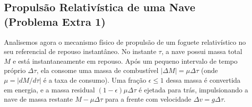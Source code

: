 \documentclass[11pt, a4paper]{article}
\begin{document}
\subsection{Propulsão Relativística de uma Nave (Problema Extra 1)}

Analisemos agora o mecanismo físico de propulsão de um foguete relativístico no seu referencial de repouso instantâneo. No instante $\tau$, a nave possui massa total $M$ e está instantaneamente em repouso. Após um pequeno intervalo de tempo próprio $\Delta \tau$, ela consome uma massa de combustível $|\Delta M| = \mu \Delta \tau$ (onde $\mu = |dM/d\tau|$ é a taxa de consumo). Uma fração $\epsilon \le 1$ dessa massa é convertida em energia, e a massa residual $(1 - \epsilon) \mu \Delta \tau$ é ejetada para trás, impulsionando a nave de massa restante $M - \mu \Delta \tau$ para a frente com velocidade $\Delta v = g \Delta \tau$.
\end{document}
